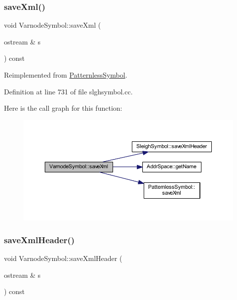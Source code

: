 \subsubsection{\texorpdfstring{saveXml()}{saveXml()}}
{\footnotesize\ttfamily void Varnode\+Symbol\+::save\+Xml (\begin{DoxyParamCaption}\item[{ostream \&}]{s }\end{DoxyParamCaption}) const\hspace{0.3cm}{\ttfamily [virtual]}}



Reimplemented from \mbox{\hyperlink{class_patternless_symbol_a4afb029a1e6456ffa90468cb29587529}{Patternless\+Symbol}}.



Definition at line 731 of file slghsymbol.\+cc.

Here is the call graph for this function\+:
\nopagebreak
\begin{figure}[H]
\begin{center}
\leavevmode
\includegraphics[width=350pt]{class_varnode_symbol_aed153df5b4c3fdb8c04bf422e2ea329b_cgraph}
\end{center}
\end{figure}
\mbox{\label{class_varnode_symbol_a897bc5a3be293e1067070b26eb5fa14b}} 
\subsubsection{\texorpdfstring{saveXmlHeader()}{saveXmlHeader()}}
{\footnotesize\ttfamily void Varnode\+Symbol\+::save\+Xml\+Header (\begin{DoxyParamCaption}\item[{ostream \&}]{s }\end{DoxyParamCaption}) const\hspace{0.3cm}{\ttfamily [virtual]}}




